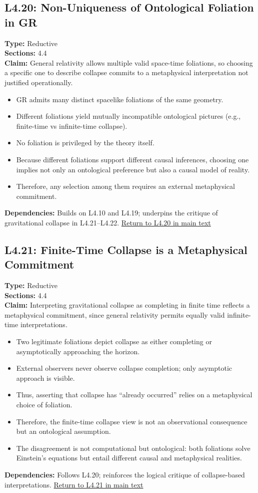 \documentclass[12pt]{book}
\newcommand{\returnlink}[1]{\hyperref[logic:#1]{Return to #1 in main text}\xspace}
\begin{document}
\subsection*{L4.20: Non-Uniqueness of Ontological Foliation in GR}
\label{appendix:L4.20}
\textbf{Type:} Reductive \\
\textbf{Sections:} 4.4 \\
\textbf{Claim:} General relativity allows multiple valid space-time foliations, so choosing a specific one to describe collapse commits to a metaphysical interpretation not justified operationally.
\begin{itemize}
  \item GR admits many distinct spacelike foliations of the same geometry.
  \item Different foliations yield mutually incompatible ontological pictures (e.g., finite-time vs infinite-time collapse).
  \item No foliation is privileged by the theory itself.
  \item Because different foliations support different causal inferences, choosing one implies not only an ontological preference but also a causal model of reality.
  \item Therefore, any selection among them requires an external metaphysical commitment.
\end{itemize}
\textbf{Dependencies:} Builds on L4.10 and L4.19; underpins the critique of gravitational collapse in L4.21–L4.22.
\returnlink{L4.20}

\subsection*{L4.21: Finite-Time Collapse is a Metaphysical Commitment}
\label{appendix:L4.21}
\textbf{Type:} Reductive \\
\textbf{Sections:} 4.4 \\
\textbf{Claim:} Interpreting gravitational collapse as completing in finite time reflects a metaphysical commitment, since general relativity permits equally valid infinite-time interpretations.
\begin{itemize}
  \item Two legitimate foliations depict collapse as either completing or asymptotically approaching the horizon.
  \item External observers never observe collapse completion; only asymptotic approach is visible.
  \item Thus, asserting that collapse has ``already occurred'' relies on a metaphysical choice of foliation.
  \item Therefore, the finite-time collapse view is not an observational consequence but an ontological assumption.
  \item The disagreement is not computational but ontological: both foliations solve Einstein's equations but entail different causal and metaphysical realities.
\end{itemize}
\textbf{Dependencies:} Follows L4.20; reinforces the logical critique of collapse-based interpretations.
\returnlink{L4.21}
\end{document}
